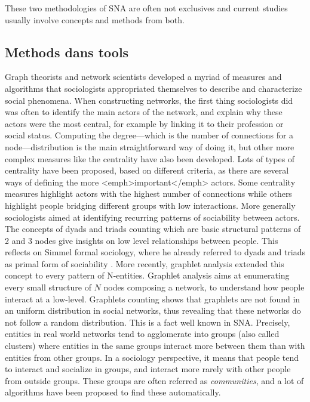 These two methodologies of SNA are often not exclusives and current studies usually involve concepts and methods from both.

\subsection{Methods dans tools}\label{subsec:methods-dans-tools}

Graph theorists and network scientists developed a myriad of measures and algorithms that sociologists appropriated themselves to describe and characterize social phenomena.
When constructing networks, the first thing sociologists did was often to identify the main actors of the network, and explain why these actors were the most central, for example by linking it to their profession or social status.
Computing the degree---which is the number of connections for a node---distribution is the main straightforward way of doing it, but other more complex measures like the centrality have also been developed.
Lots of types of centrality have been proposed, based on different criteria, as there are several ways of defining the more <emph>important</emph> actors.
Some centrality measures highlight actors with the highest number of connections while others highlight people bridging different groups with low interactions.
More generally sociologists aimed at identifying recurring patterns of sociability between actors.
The concepts of dyads and triads counting which are basic structural patterns of 2 and 3 nodes give insights on low level relationships between people.
This reflects on Simmel formal sociology, where he already referred to dyads and triads as primal form of sociability \cite{simmel2013}.
More recently, graphlet analysis extended this concept to every pattern of N-entities.
Graphlet analysis aims at enumerating every small structure of $N$ nodes composing a network, to understand how people interact at a low-level.
Graphlets counting shows that graphlets are not found in an uniform distribution in social networks, thus revealing that these networks do not follow a random distribution.
This is a fact well known in SNA. Precisely, entities in real world networks tend to agglomerate into groups (also called clusters) where entities in the same groups interact more between them than with entities from other groups.
In a sociology perspective, it means that people tend to interact and socialize in groups, and interact more rarely with other people from outside groups.
These groups are often referred as \emph{communities}, and a lot of algorithms have been proposed to find these automatically.

